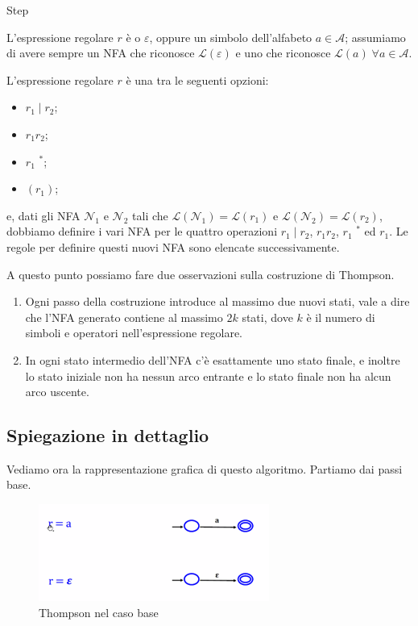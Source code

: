 \documentclass[class=book, crop=false, oneside, 12pt]{standalone}
\begin{document}
\begin{labeling}{Step}
    \item[Base] L'espressione regolare \(r\) è o \(\varepsilon\), oppure un simbolo dell’alfabeto \(a \in \mathcal{A}\); assumiamo di avere sempre un NFA che riconosce \(\mathcal{L}(\varepsilon)\) e uno che riconosce \(\mathcal{L}(a) \; \forall a \in \mathcal{A}\).
    \item[Step] L'espressione regolare \(r\) è una tra le seguenti opzioni: 
    \begin{itemize}[noitemsep]
        \item \(r_1 \mid  r_2 \);
        \item \( r_1 r_2 \); 
        \item \( r_1\) \(^\ast \);
        \item \((r_1)\);
    \end{itemize}
    e, dati gli NFA \(\mathcal{N}_1\) e \(\mathcal{N}_2\) tali che \(\mathcal{L}(\mathcal{N}_1)=\mathcal{L}(r_1)\) e \(\mathcal{L}(\mathcal{N}_2) = \mathcal{L}(r_2)\), dobbiamo definire i vari NFA per le quattro operazioni \(r_1 \mid r_2\), \(r_1 r_2\), \(r_1\) \(^\ast\) ed \(r_1\). Le regole per definire questi nuovi NFA sono elencate successivamente.
\end{labeling}

\noindent A questo punto possiamo fare due osservazioni sulla costruzione di Thompson.

\begin{enumerate}
    \item Ogni passo della costruzione introduce al massimo due nuovi stati, vale a dire che l’NFA generato contiene al massimo \(2k\) stati, dove \(k\) è il numero di simboli e operatori nell’espressione regolare.
    \item In ogni stato intermedio dell’NFA c’è esattamente uno stato finale, e inoltre lo stato iniziale non ha nessun arco entrante e lo stato finale non ha alcun arco uscente. 
\end{enumerate}

\subsection{Spiegazione in dettaglio}
Vediamo ora la rappresentazione grafica di questo algoritmo. Partiamo dai passi base.

\begin{figure}
    \centering
    \includegraphics[width=.5\textwidth,keepaspectratio]{Thompson_base}
    \caption{Thompson nel caso base}
    \label{Thompson_base}
\end{figure}
\end{document}
